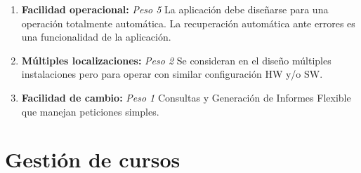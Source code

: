 \documentclass[11pt,a4paper,spanish,twoside]{book}
\begin{document}
\begin{enumerate}[{\bf 1.}]
\item {\bf Facilidad operacional:} \emph{Peso 5} La aplicación debe diseñarse
  para una operación totalmente automática. La recuperación automática ante
  errores es una funcionalidad de la aplicación. 

\item {\bf Múltiples localizaciones:} \emph{Peso 2} Se consideran en el diseño múltiples
  instalaciones pero para operar con similar configuración HW y/o SW.

\item {\bf Facilidad de cambio:} \emph{Peso 1} Consultas y Generación de
  Informes Flexible que manejan peticiones simples.

\end{enumerate}

\section{Gestión de cursos}
\end{document}
